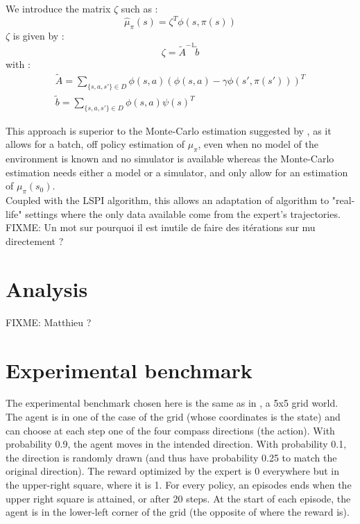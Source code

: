 \documentclass{article}
\begin{document}
We introduce the matrix $\zeta$ such as :
\begin{equation}
\hat \mu_\pi (s) = \zeta^T\phi(s,\pi(s))
\end{equation}
$\zeta$ is given by :
\begin{equation}
\zeta = \tilde A^{-1}\tilde b
\end{equation}
with :
\begin{eqnarray}
\tilde A = \sum_{\{s,a,s'\} \in D}\phi(s,a)\left(\phi(s,a) - \gamma \phi(s',\pi(s'))\right)^T\\
\tilde b = \sum_{\{s,a,s'\} \in D} \phi(s,a)\psi(s)^T
\end{eqnarray}

This approach is superior to the Monte-Carlo estimation suggested by \citet{abbeel2004apprenticeship}, as it allows for a batch, off policy estimation of $\mu_\pi$, even when no model of the environment is known and no simulator is available whereas the Monte-Carlo estimation needs either a model or a simulator, and only allow for an estimation of $\mu_\pi(s_0)$.\\

Coupled with the LSPI algorithm, this allows an adaptation of \citet{abbeel2004apprenticeship} algorithm to "real-life" settings where the only data available come from the expert's trajectories.\\

FIXME: Un mot sur pourquoi il est inutile de faire des itérations sur mu directement ?

\section{Analysis}
FIXME: Matthieu ?
\section{Experimental benchmark}
The experimental benchmark chosen here is the same as in \citep{ng2000algorithms}, a 5x5 grid world. The agent is in one of the case of the grid (whose coordinates is the state) and can choose at each step one of the four compass directions (the action). With probability 0.9, the agent moves in the intended direction. With probability 0.1, the direction is randomly drawn (and thus have probability 0.25 to match the original direction). The reward optimized by the expert is 0 everywhere but in the upper-right square, where it is 1. For every policy, an episodes ends when the upper right square is attained, or after 20 steps. At the start of each episode, the agent is in the lower-left corner of the grid (the opposite of where the reward is).\\
\end{document}
